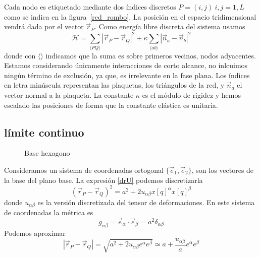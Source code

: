 Cada nodo es etiquetado mediante dos índices discretos $P=(i,j)\ i,j=1,L$
como se indica en la figura~\ref{red_rombo}. La posición en el espacio
tridimensional vendrá dada por el vector $\vec{r}_P$. Como energía libre discreta del sistema usamos
\begin{equation}
\mathcal{H}=\sum_{\langle PQ \rangle}
|\vec{r}_P-\vec{r}_Q|^2+\kappa\sum_{\langle ab \rangle}
|\vec{n}_a-\vec{n}_b|^2 
\end{equation}
donde con $\langle\rangle$ indicamos que la suma es sobre primeros vecinos,
nodos adyacentes. Estamos considerando únicamente interacciones de corto
alcance,  no inlcuimos ningún término de exclusión, ya que, es irrelevante en
la fase plana. Los  índices en letra minúscula representan las plaquetas, 
los triángulos de la red, y $\vec{n}_{a}$ el vector normal a la plaqueta. La
constante $\kappa$ es el módulo de rigidez y hemos escalado las posiciones de
forma que la constante elástica es unitaria.


\subsection{límite continuo}
\begin{figure}[h]
\centering
 \resizebox{\columnwidth}{!}{}
\caption{Base hexagono}
\end{figure}   
Consideramos un sistema de coordenadas ortogonal $\{ \vec{e}_1,\vec{e}_2\}$, son los vectores de la base del plano base. La expresión \eqref{drU} podemos discretizarla
\begin{equation}
(\vec{r}_P-\vec{r}_Q)^2=a^2+2u_{\alpha\beta}x{\scriptstyle [q]}^{\alpha}x{\scriptstyle [q]}^{\beta}
\end{equation}
donde $u_{\alpha\beta}$ es la versión discretizada del tensor de
deformaciones. En este  sistema de coordenadas la métrica es
\begin{equation}
g_{\alpha\beta}=\vec{e}_{\alpha}\cdot\vec{e}_{\beta}=a^2\delta_{\alpha\beta}
\end{equation}
Podemos aproximar
\begin{equation}
|\vec{r}_P-\vec{r}_Q|=\sqrt{a^2+2u_{\alpha\beta}e^{\alpha}e^{\beta}}\simeq a + \frac{u_{\alpha\beta}}{a}e^{\alpha}e^{\beta}
\end{equation}



